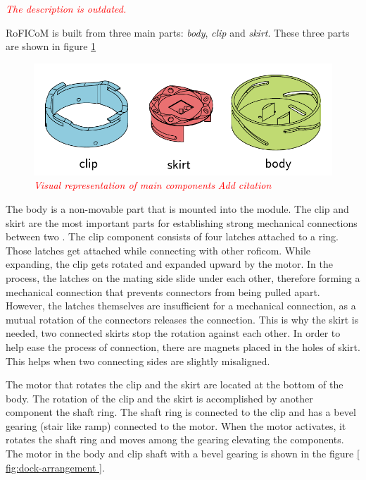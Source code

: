 \documentclass[
  digital,     %
  oneside,     %
  nosansbold,  %
  nocolorbold, %
  lof,         %
  lot,         %
]{fithesis4}
\newcommand{\TODO}[1]{\textcolor{red}{\textit{#1}}}
\begin{document}
\TODO{The description is outdated.}

RoFICoM is built from three main parts: \emph{body}, \emph{clip} and \emph{skirt}. These three parts are shown in figure \ref{ fig:key-components }

\begin{figure}
    \includegraphics{ dock_key_components.pdf }
    \caption{ \TODO{ Visual representation of main components } \TODO{Add citation} }
    \label{ fig:key-components }
\end{figure}

The body is a non-movable part that is mounted into the module.
The clip and skirt are the most important parts for establishing strong mechanical connections between two .
The clip component consists of four latches attached to a ring. Those latches get attached while connecting with
other \acrshort{roficom}. While expanding, the clip gets rotated and expanded upward by the motor. In the process, the latches on the mating
side slide under each other, therefore forming a mechanical connection that prevents connectors from being pulled apart.
However, the latches themselves are insufficient for a mechanical connection, as a mutual rotation of the connectors releases
the connection. This is why the skirt is needed, two connected skirts stop the rotation against each other. In order to help ease the process of connection, there are magnets placed in the holes of skirt. This helps when two connecting sides are slightly misaligned.

The motor that rotates the clip and the skirt are located at the bottom of the body. The rotation of the clip and the skirt is accomplished by another component the shaft ring. The shaft ring is connected to the clip and has a bevel gearing (stair like ramp) connected to the motor. When the motor activates, it rotates the shaft ring and moves among the gearing elevating the components. The motor in the body and clip shaft with a bevel gearing is shown in the figure \ref{ fig:dock-arrangement }.
\end{document}
